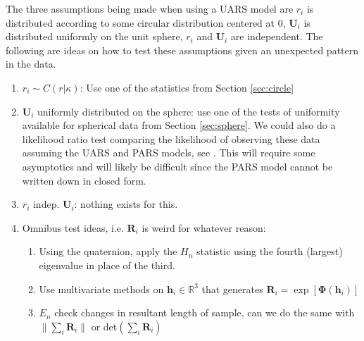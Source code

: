 \documentclass{article}\usepackage[]{graphicx}\usepackage[]{color}
\newcommand{\R}{{\mathbb{R}}}
\begin{document}
The three assumptions being made when using a UARS model are $r_i$ is distributed according to some circular distribution centered at $0$, $\bm U_i$ is distributed uniformly on the unit sphere, $r_i$ and $\bm U_i$ are independent.  The following are ideas on how to test these assumptions given an unexpected pattern in the data.
\begin{enumerate}
\item $r_i\sim C(r|\kappa)$: Use one of the statistics from Section \ref{sec:circle}
\item $\bm U_i$ uniformly distributed on the sphere:  use one of the tests of uniformity available for spherical data from Section \ref{sec:sphere}.  We could also do a likelihood ratio test comparing the likelihood of observing these data assuming the UARS and PARS models, see  \cite{bingham2012}.  This will require some asymptotics and will likely be difficult since the PARS model cannot be written down in closed form.
\item $r_i$ indep. $\bm U_i$: nothing exists for this.  
\item Omnibus test ideas, i.e. $\bm R_i$ is weird for whatever reason:
\begin{enumerate}
\item Using the quaternion, apply the $H_n$ statistic using the fourth (largest) eigenvalue in place of the third.
\item Use multivariate methods on $\bm h_i\in\R^3$ that generates $\bm R_i=\exp[\bm{\Phi}(\bm h_i)]$
\item $E_n$ check changes in resultant length of sample, can we do the same with $\|\sum_i\bm R_i\|$ or det$(\sum_i \bm R_i)$
\end{enumerate}
\end{enumerate}


\end{document}
